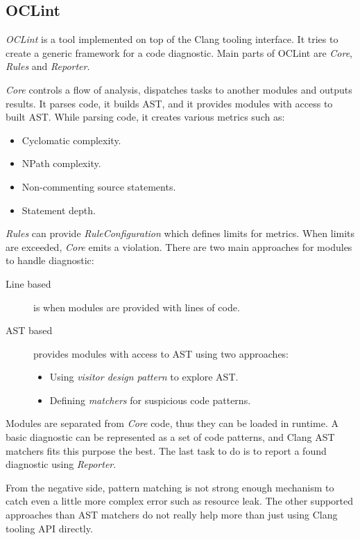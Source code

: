 \subsection{OCLint}
\emph{OCLint} \cite{oclint} is a tool implemented on top of the Clang tooling interface. It tries to create  a generic framework for a code diagnostic. Main parts of OCLint are \emph{Core}, \emph{Rules} and \emph{Reporter}.

\emph{Core} controls a flow of analysis, dispatches tasks to another modules and outputs results. It parses code, it builds AST, and it provides modules with access to built AST. While parsing code, it creates various metrics such as:

\begin{itemize}
\item Cyclomatic complexity.
\item NPath complexity.
\item Non-commenting source statements.
\item Statement depth.
\end{itemize}

\emph{Rules} can provide \emph{RuleConfiguration} which defines limits for metrics. When limits are exceeded, \emph{Core} emits a violation. There are two main approaches for modules to handle diagnostic:

\begin{description}
\item[Line based] is when modules are provided with lines of code.
\item[AST based] provides modules with access to AST using two approaches:
	\begin{itemize}
	\item Using \emph{visitor design pattern} to explore AST.
	\item Defining \emph{matchers} for suspicious code patterns.
	\end{itemize}
\end{description}

Modules are separated from \emph{Core} code, thus they can be loaded in runtime. A basic diagnostic can be represented as a set of code patterns, and Clang AST matchers fits this purpose the best. The last task to do is to report a found diagnostic using \emph{Reporter}.

From the negative side, pattern matching is not strong enough mechanism to catch even a little more complex error such as resource leak. The other supported approaches than AST matchers do not really help more than just using Clang tooling API directly.

